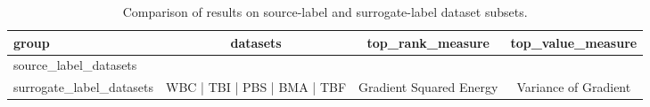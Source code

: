\begin{table}[t]
\centering
\caption{Comparison of results on source-label and surrogate-label dataset subsets.}
\begin{tabular}{lccc}
\hline
group & datasets & top_rank_measure & top_value_measure \\
\hline
source\_label\_datasets &  &  &  \\
surrogate\_label\_datasets & WBC | TBI | PBS | BMA | TBF & Gradient Squared Energy & Variance of Gradient \\
\hline
\end{tabular}
\end{table}
